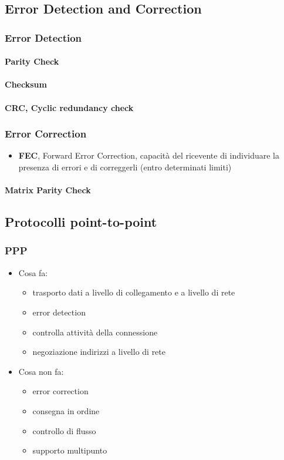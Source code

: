 \documentclass[12pt,a4paper]{article}
\begin{document}
\subsection{Error Detection and Correction}
\subsubsection{Error Detection}
\paragraph{Parity Check}
\paragraph{Checksum}
\paragraph{CRC, Cyclic redundancy check}

\subsubsection{Error Correction}
\begin{itemize}
  \item \textbf{FEC}, Forward Error Correction, capacità del ricevente
    di individuare la presenza di errori e di correggerli (entro determinati
    limiti)
\end{itemize}
\paragraph{Matrix Parity Check}

\subsection{Protocolli point-to-point}
\subsubsection{PPP}
\begin{itemize}
  \item Cosa fa:
  \begin{itemize}
    \item trasporto dati a livello di collegamento e a livello di rete
    \item error detection
    \item controlla attività della connessione
    \item negoziazione indirizzi a livello di rete
  \end{itemize}
  \item Cosa non fa:
  \begin{itemize}
    \item error correction
    \item consegna in ordine
    \item controllo di flusso
    \item supporto multipunto
  \end{itemize}
\end{itemize}
\end{document}
